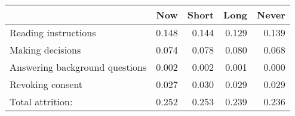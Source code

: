 \begin{table}[t]
\fontsize{12.0pt}{14.4pt}\selectfont
\begin{tabular*}{\linewidth}{@{\extracolsep{\fill}}lrrrr}
\toprule
  & Now & Short & Long & Never \\ 
\midrule\addlinespace[2.5pt]
Reading instructions & 0.148 & 0.144 & 0.129 & 0.139 \\ 
Making decisions & 0.074 & 0.078 & 0.080 & 0.068 \\ 
Answering background questions & 0.002 & 0.002 & 0.001 & 0.000 \\ 
Revoking consent & 0.027 & 0.030 & 0.029 & 0.029 \\ 
{Total attrition:} & {0.252} & {0.253} & {0.239} & {0.236} \\ 
\bottomrule
\end{tabular*}
\end{table}

